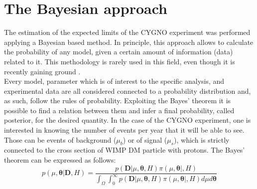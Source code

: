 \documentclass[physics,article,submit,moreauthors,pdftex]{Definitions/mdpi}
\begin{document}
\section{The Bayesian approach}
The estimation of the expected limits of the CYGNO experiment was performed applying a Bayesian based method. In principle, this approach allows to calculate the probability of any model, given a certain amount of information (data) related to it. This methodology is rarely used in this field, even though it is recently gaining ground \cite{bib:ROSZKOWSKI200910,bib:TROTTA2007316,bib:Strege_2012,bib:arina2014bayesian,bib:Bringmann_2017,bib:Liem_2016,bib:Messina_2020,bib:di_Cortona_2020}.\\
Every model, parameter which is of interest to the specific analysis, and experimental data are all considered connected to a probability distribution and, as such, follow the rules of probability. Exploiting the Bayes' theorem it is possible to find a relation between them and infer a final probability, called posterior, for the desired quantity. In the case of the CYGNO experiment, one is interested in knowing the number of events per year that it will be able to see. Those can be events of background ($\mu_b$) or of signal ($\mu_s$), which is strictly connected to the cross section of WIMP DM particle with protons. The Bayes' theorem can be expressed as follows:
\begin{equation}
\label{eq:Bayes}
 p(\mu,\boldsymbol{\theta}\vert \boldsymbol{D},H) = \frac{p(\boldsymbol{D}\vert\mu,\boldsymbol{\theta},H)\pi(\mu,\boldsymbol{\theta}\vert,H) }{ \int_{\Omega}\int_{0}^{\infty}p(\boldsymbol{D}\vert \mu,\boldsymbol{\theta},H)\pi(\mu,\boldsymbol{\theta}\vert,H)d\mu d\boldsymbol{\theta} } 
\end{equation}
\end{document}
